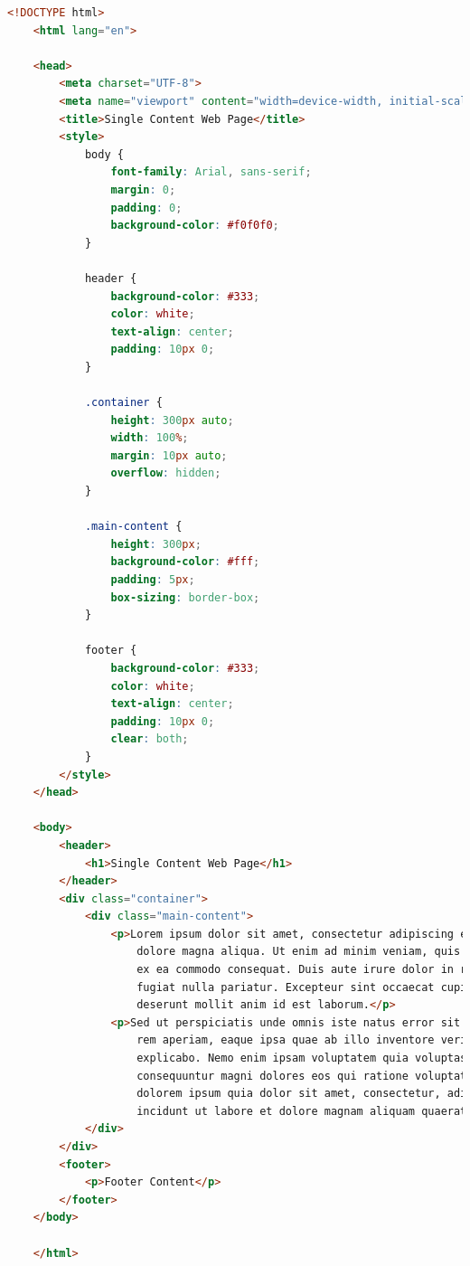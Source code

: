 \begin{lstlisting}[language=HTML, caption=requestsモジュールを用いて取得したWebページのHTMLコード例, label=lst:html_example]
    <!DOCTYPE html>
    <html lang="en">
    
    <head>
        <meta charset="UTF-8">
        <meta name="viewport" content="width=device-width, initial-scale=1.0">
        <title>Single Content Web Page</title>
        <style>
            body {
                font-family: Arial, sans-serif;
                margin: 0;
                padding: 0;
                background-color: #f0f0f0;
            }
    
            header {
                background-color: #333;
                color: white;
                text-align: center;
                padding: 10px 0;
            }
    
            .container {
                height: 300px auto;
                width: 100%;
                margin: 10px auto;
                overflow: hidden;
            }
    
            .main-content {
                height: 300px;
                background-color: #fff;
                padding: 5px;
                box-sizing: border-box;
            }
    
            footer {
                background-color: #333;
                color: white;
                text-align: center;
                padding: 10px 0;
                clear: both;
            }
        </style>
    </head>
    
    <body>
        <header>
            <h1>Single Content Web Page</h1>
        </header>
        <div class="container">
            <div class="main-content">
                <p>Lorem ipsum dolor sit amet, consectetur adipiscing elit. Sed do eiusmod tempor incididunt ut labore et
                    dolore magna aliqua. Ut enim ad minim veniam, quis nostrud exercitation ullamco laboris nisi ut aliquip
                    ex ea commodo consequat. Duis aute irure dolor in reprehenderit in voluptate velit esse cillum dolore eu
                    fugiat nulla pariatur. Excepteur sint occaecat cupidatat non proident, sunt in culpa qui officia
                    deserunt mollit anim id est laborum.</p>
                <p>Sed ut perspiciatis unde omnis iste natus error sit voluptatem accusantium doloremque laudantium, totam
                    rem aperiam, eaque ipsa quae ab illo inventore veritatis et quasi architecto beatae vitae dicta sunt
                    explicabo. Nemo enim ipsam voluptatem quia voluptas sit aspernatur aut odit aut fugit, sed quia
                    consequuntur magni dolores eos qui ratione voluptatem sequi nesciunt. Neque porro quisquam est, qui
                    dolorem ipsum quia dolor sit amet, consectetur, adipisci velit, sed quia non numquam eius modi tempora
                    incidunt ut labore et dolore magnam aliquam quaerat voluptatem.</p>
            </div>
        </div>
        <footer>
            <p>Footer Content</p>
        </footer>
    </body>
    
    </html>
\end{lstlisting}

